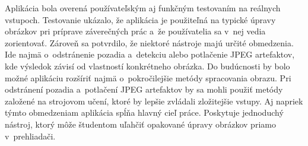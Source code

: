 Aplikácia bola overená používateľským aj funkčným testovaním na reálnych vstupoch. Testovanie ukázalo, že aplikácia je použiteľná na typické úpravy obrázkov pri príprave záverečných prác a~že používatelia sa v~nej vedia zorientovať. Zároveň sa potvrdilo, že niektoré nástroje majú určité obmedzenia. Ide najmä o~odstránenie pozadia a~detekciu alebo potlačenie JPEG artefaktov, kde výsledok závisí od vlastností konkrétneho obrázka. Do budúcnosti by bolo možné aplikáciu rozšíriť najmä o~pokročilejšie metódy spracovania obrazu. Pri odstránení pozadia a~potlačení JPEG artefaktov by sa mohli použiť metódy založené na strojovom učení, ktoré by lepšie zvládali zložitejšie vstupy. Aj napriek týmto obmedzeniam aplikácia spĺňa hlavný cieľ práce. Poskytuje jednoduchý nástroj, ktorý môže študentom uľahčiť opakované úpravy obrázkov priamo v~prehliadači.